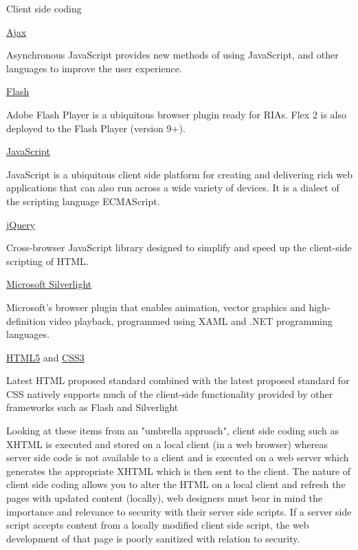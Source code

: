\begin{compactitem}
\item Client side coding

\begin{compactitem}
\item \href{http://en.wikipedia.org/wiki/Ajax_(programming)}{Ajax}

Asynchronous JavaScript provides new methods of using JavaScript, and other languages to improve the user experience.
\item \href{http://en.wikipedia.org/wiki/Adobe_Flash}{Flash}

Adobe Flash Player is a ubiquitous browser plugin ready for RIAs. Flex 2 is also deployed to the Flash Player (version 9+).
\item \href{http://en.wikipedia.org/wiki/JavaScript}{JavaScript}

JavaScript is a ubiquitous client side platform for creating and delivering rich web applications that can also run across a wide variety of devices. It is a dialect of the scripting language ECMAScript.
\item \href{http://en.wikipedia.org/wiki/JQuery}{jQuery}

Cross-browser JavaScript library designed to simplify and speed up the client-side scripting of HTML.
\item \href{http://en.wikipedia.org/wiki/Microsoft_Silverlight}{Microsoft Silverlight}

Microsoft's browser plugin that enables animation, vector graphics and high-definition video playback, programmed using XAML and .NET programming languages.
\item \href{http://en.wikipedia.org/wiki/HTML5}{HTML5} and \href{http://en.wikipedia.org/wiki/CSS3}{CSS3}

Latest HTML proposed standard combined with the latest proposed standard for CSS natively supports much of the client-side functionality provided by other frameworks such as Flash and Silverlight
\end{compactitem}

Looking at these items from an "umbrella approach", client side coding such as XHTML is executed and stored on a local client (in a web browser) whereas server side code is not available to a client and is executed on a web server which generates the appropriate XHTML which is then sent to the client. The nature of client side coding allows you to alter the HTML on a local client and refresh the pages with updated content (locally), web designers must bear in mind the importance and relevance to security with their server side scripts. If a server side script accepts content from a locally modified client side script, the web development of that page is poorly sanitized with relation to security.


\end{compactitem}
